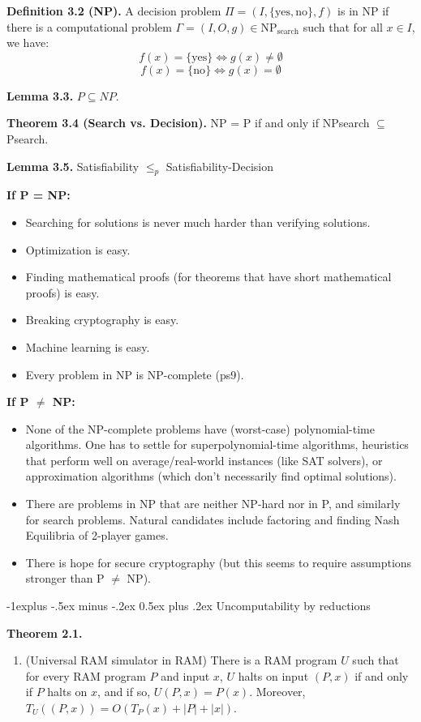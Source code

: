 \documentclass[10pt,landscape]{article}
\makeatletter
\renewcommand{\subsection}{\@startsection{subsection}{2}{0mm}%
                                {-1explus -.5ex minus -.2ex}%
                                {0.5ex plus .2ex}%
                                {\normalfont\normalsize\bfseries}}
\makeatother
\begin{document}
\begin{multicols*}{3}
\textbf{Definition 3.2 (NP).} A decision problem $\Pi = (I, \{\text{yes}, \text{no}\}, f)$ is in NP if there is a computational problem $\Gamma = (I, O, g) \in \text{NP}_{\text{search}}$ such that for all $x \in I$, we have:
\[ f(x) = \{\text{yes}\} \Leftrightarrow g(x) \neq \emptyset \]
\[ f(x) = \{\text{no}\} \Leftrightarrow g(x) = \emptyset \]

\textbf{Lemma 3.3.} $P \subseteq NP$.

\textbf{Theorem 3.4 (Search vs. Decision).} NP = P if and only if NPsearch $\subseteq$ Psearch.

\textbf{Lemma 3.5.} Satisfiability $\leq_p$ Satisfiability-Decision

\textbf{If P = NP:}
\begin{itemize}
  \item Searching for solutions is never much harder than verifying solutions.
  \item Optimization is easy.
  \item Finding mathematical proofs (for theorems that have short mathematical proofs) is easy.
  \item Breaking cryptography is easy.
  \item Machine learning is easy.
  \item Every problem in NP is NP-complete (ps9).
\end{itemize}

\textbf{If P $\neq$ NP:}
\begin{itemize}
  \item None of the NP-complete problems have (worst-case) polynomial-time algorithms. One has to settle for superpolynomial-time algorithms, heuristics that perform well on average/real-world instances (like SAT solvers), or approximation algorithms (which don't necessarily find optimal solutions).
  \item There are problems in NP that are neither NP-hard nor in P, and similarly for search problems. Natural candidates include factoring and finding Nash Equilibria of 2-player games.
  \item There is hope for secure cryptography (but this seems to require assumptions stronger than P $\neq$ NP).
\end{itemize}

\subsection{Uncomputability by reductions}

\textbf{Theorem 2.1.}
\begin{enumerate}
  \item (Universal RAM simulator in RAM) There is a RAM program $U$ such that for every RAM program $P$ and input $x$, $U$ halts on input $(P, x)$ if and only if $P$ halts on $x$, and if so, $U(P, x) = P(x)$. Moreover, $T_U((P, x)) = O(T_P(x) + |P| + |x|)$.


\end{enumerate}
\end{multicols*}
\end{document}
